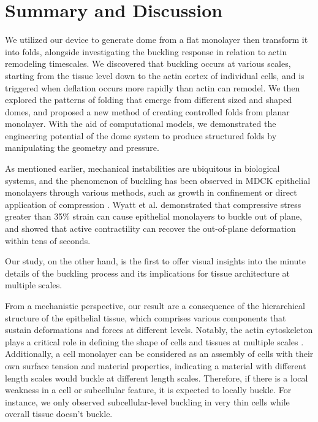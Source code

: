\newpage
\hypertarget{summary-and-discussion-1}{%
	\section{Summary and Discussion}\label{summary-and-discussion-1}}

We utilized our device to generate dome from a flat monolayer then transform it into folds, alongside investigating the buckling response in relation to actin remodeling timescales. We discovered that buckling occurs at various scales, starting from the tissue level down to the actin cortex of individual cells, and is triggered when deflation occurs more rapidly than actin can remodel. We then explored the patterns of folding that emerge from different sized and shaped domes, and proposed a new method of creating controlled folds from planar monolayer. With the aid of computational models, we demonstrated the engineering potential of the dome system to produce structured folds by manipulating the geometry and pressure.

As mentioned earlier, mechanical instabilities are ubiquitous in biological systems, and the phenomenon of buckling has been observed in MDCK epithelial monolayers through various methods, such as growth in confinement or direct application of compression \cite{wyatt2020,trushko2020}. Wyatt et al. demonstrated that compressive stress greater than 35\% strain can cause epithelial monolayers to buckle out of plane, and showed that active contractility can recover the out-of-plane deformation within tens of seconds.

Our study, on the other hand, is the first to offer visual insights into the minute details of the buckling process and its implications for tissue architecture at multiple scales.

From a mechanistic perspective, our result are a consequence of the hierarchical structure of the epithelial tissue, which comprises various components that sustain deformations and forces at different levels. Notably, the actin cytoskeleton plays a critical role in defining the shape of cells and tissues at multiple scales  \cite{clarke2021}. Additionally, a cell monolayer can be considered as an assembly of cells with their own surface tension and material properties, indicating a material with different length scales would buckle at different length scales. Therefore, if there is a local weakness in a cell or subcellular feature, it is expected to locally buckle. For instance, we only observed subcellular-level buckling in very thin cells while overall tissue doesn't buckle.

